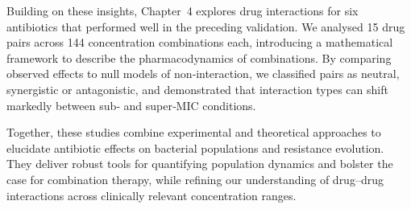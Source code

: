Building on these insights, Chapter~4 explores drug interactions for six antibiotics that performed well in the preceding validation.
We analysed 15 drug pairs across 144 concentration combinations each, introducing a mathematical framework to describe the pharmacodynamics of combinations.
By comparing observed effects to null models of non‑interaction, we classified pairs as neutral, synergistic or antagonistic, and demonstrated that interaction types can shift markedly between sub‑ and super‑MIC conditions.

Together, these studies combine experimental and theoretical approaches to elucidate antibiotic effects on bacterial populations and resistance evolution.
They deliver robust tools for quantifying population dynamics and bolster the case for combination therapy, while refining our understanding of drug–drug interactions across clinically relevant concentration ranges.
